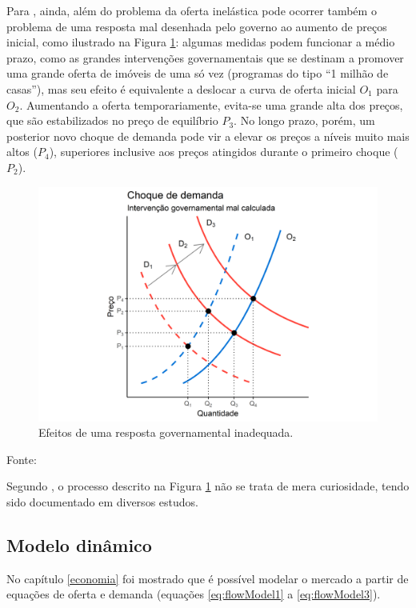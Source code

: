 \documentclass[
	12pt,				%
	oneside,			%
	a4paper,			%
	chapter=TITLE,		%
	section=TITLE,		%
	english,			%
	brazil				%
	]{abntex2}
\newcommand{\bcenter}{\begin{center}}
\newcommand{\ecenter}{\end{center}}
\begin{document}
Para \textcite[p.~11]{regulation}, ainda, além do problema da oferta inelástica pode
ocorrer também o problema de uma resposta mal desenhada pelo governo ao aumento
de preços inicial, como ilustrado na Figura \ref{fig:choque2}: algumas medidas
podem funcionar a médio prazo, como as grandes intervenções governamentais que
se destinam a promover uma grande oferta de imóveis de uma só vez (programas do
tipo ``1 milhão de casas''), mas seu efeito é equivalente a deslocar a curva de
oferta inicial \(O_1\) para \(O_2\). Aumentando a oferta temporariamente, evita-se
uma grande alta dos preços, que são estabilizados no preço de equilíbrio \(P_3\).
No longo prazo, porém, um posterior novo choque de demanda pode vir a elevar os
preços a níveis muito mais altos (\(P_4\)), superiores inclusive aos preços
atingidos durante o primeiro choque (\(P_2\)).
\begin{figure}[H]

{\centering \includegraphics[width=0.7\linewidth]{images/choque2-1} 

}

\caption{Efeitos de uma resposta governamental inadequada.}\label{fig:choque2}
\end{figure}
\bcenter

Fonte: \textcite[p.~19]{Malpezzi2002TheRO}
\ecenter

Segundo \textcite[p.~19]{Malpezzi2002TheRO}, o processo descrito na Figura
\ref{fig:choque2} não se trata de mera curiosidade, tendo sido documentado em
diversos estudos.

\hypertarget{modelo-dinuxe2mico}{%
\subsection{Modelo dinâmico}\label{modelo-dinuxe2mico}}

No capítulo \ref{economia} foi mostrado que é possível modelar o mercado a
partir de equações de oferta e demanda (equações \eqref{eq:flowModel1} a
\eqref{eq:flowModel3}).
\end{document}
